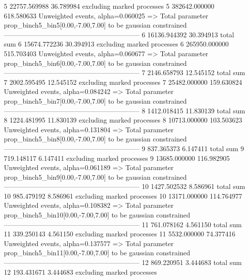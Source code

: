 5          22757.569988    36.789984       excluding marked processes    
5          382642.000000   618.580633      Unweighted events, alpha=0.060025
  => Total parameter prop_binch5_bin5[0.00,-7.00,7.00] to be gaussian constrained
------------------------------------------------------------
6          16136.944392    30.394913       total sum                     
6          15674.772236    30.394913       excluding marked processes    
6          265950.000000   515.703403      Unweighted events, alpha=0.060677
  => Total parameter prop_binch5_bin6[0.00,-7.00,7.00] to be gaussian constrained
------------------------------------------------------------
7          2146.658793     12.545152       total sum                     
7          2002.595495     12.545152       excluding marked processes    
7          25482.000000    159.630824      Unweighted events, alpha=0.084242
  => Total parameter prop_binch5_bin7[0.00,-7.00,7.00] to be gaussian constrained
------------------------------------------------------------
8          1412.018415     11.830139       total sum                     
8          1224.481995     11.830139       excluding marked processes    
8          10713.000000    103.503623      Unweighted events, alpha=0.131804
  => Total parameter prop_binch5_bin8[0.00,-7.00,7.00] to be gaussian constrained
------------------------------------------------------------
9          837.365373      6.147411        total sum                     
9          719.148117      6.147411        excluding marked processes    
9          13685.000000    116.982905      Unweighted events, alpha=0.061189
  => Total parameter prop_binch5_bin9[0.00,-7.00,7.00] to be gaussian constrained
------------------------------------------------------------
10         1427.502532     8.586961        total sum                     
10         985.479192      8.586961        excluding marked processes    
10         13171.000000    114.764977      Unweighted events, alpha=0.108382
  => Total parameter prop_binch5_bin10[0.00,-7.00,7.00] to be gaussian constrained
------------------------------------------------------------
11         761.078162      4.561150        total sum                     
11         339.250143      4.561150        excluding marked processes    
11         5532.000000     74.377416       Unweighted events, alpha=0.137577
  => Total parameter prop_binch5_bin11[0.00,-7.00,7.00] to be gaussian constrained
------------------------------------------------------------
12         869.220951      3.444683        total sum                     
12         193.431671      3.444683        excluding marked processes    
